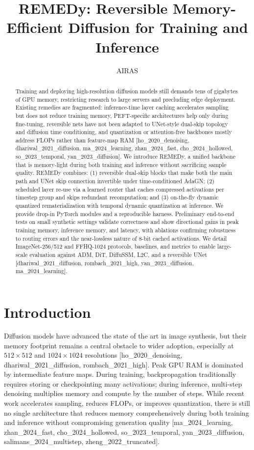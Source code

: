 \documentclass{article}
\title{REMEDy: Reversible Memory-Efficient Diffusion for Training and Inference}
\author{AIRAS}
\begin{document}
\maketitle

\begin{abstract}
Training and deploying high-resolution diffusion models still demands tens of gigabytes of GPU memory, restricting research to large servers and precluding edge deployment. Existing remedies are fragmented: inference-time layer caching accelerates sampling but does not reduce training memory, PEFT-specific architectures help only during fine-tuning, reversible nets have not been adapted to UNet-style dual-skip topology and diffusion time conditioning, and quantization or attention-free backbones mostly address FLOPs rather than feature-map RAM [ho_2020_denoising, dhariwal_2021_diffusion, ma_2024_learning, zhan_2024_fast, cho_2024_hollowed, so_2023_temporal, yan_2023_diffusion]. We introduce REMEDy, a unified backbone that is memory-light during both training and inference without sacrificing sample quality. REMEDy combines: (1) reversible dual-skip blocks that make both the main path and UNet skip connection invertible under time-conditioned AdaGN; (2) scheduled layer re-use via a learned router that caches compressed activations per timestep group and skips redundant recomputation; and (3) on-the-fly dynamic quantized rematerialization with temporal dynamic quantization at inference. We provide drop-in PyTorch modules and a reproducible harness. Preliminary end-to-end tests on small synthetic settings validate correctness and show directional gains in peak training memory, inference memory, and latency, with ablations confirming robustness to routing errors and the near-lossless nature of 8-bit cached activations. We detail ImageNet-256/512 and FFHQ-1024 protocols, baselines, and metrics to enable large-scale evaluation against ADM, DiT, DiffuSSM, L2C, and a reversible UNet [dhariwal_2021_diffusion, rombach_2021_high, yan_2023_diffusion, ma_2024_learning].
\end{abstract}



\section{Introduction}
Diffusion models have advanced the state of the art in image synthesis, but their memory footprint remains a central obstacle to wider adoption, especially at $512\times 512$ and $1024\times 1024$ resolutions [ho_2020_denoising, dhariwal_2021_diffusion, rombach_2021_high]. Peak GPU RAM is dominated by intermediate feature maps. During training, backpropagation traditionally requires storing or checkpointing many activations; during inference, multi-step denoising multiplies memory and compute by the number of steps. While recent work accelerates sampling, reduces FLOPs, or improves quantization, there is still no single architecture that reduces memory comprehensively during both training and inference without compromising generation quality [ma_2024_learning, zhan_2024_fast, cho_2024_hollowed, so_2023_temporal, yan_2023_diffusion, salimans_2024_multistep, zheng_2022_truncated].
\end{document}
